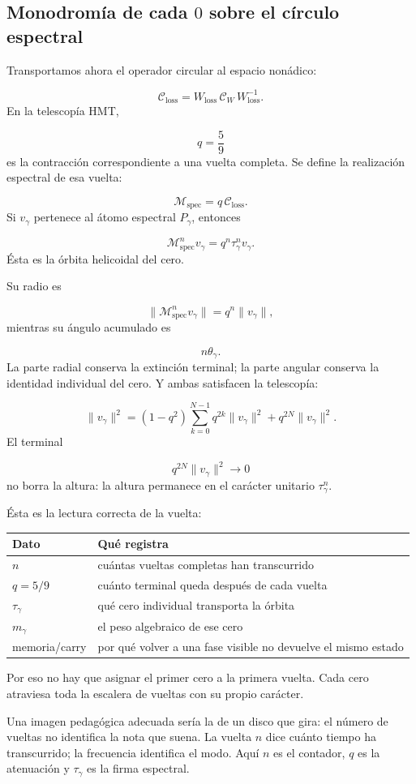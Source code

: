 \subsection{Monodromía de cada \(0\) sobre el círculo espectral}
Transportamos ahora el operador circular al espacio nonádico:\par
\[
\mathcal C_{\mathrm{loss}}
=
W_{\mathrm{loss}}\,
\mathcal C_W\,
W_{\mathrm{loss}}^{-1}.
\]
En la telescopía HMT,\par
\[
q=\frac59
\]
es la contracción correspondiente a una vuelta completa. Se define la realización espectral de esa vuelta:\par
\[
\mathcal M_{\mathrm{spec}}
=
q\,\mathcal C_{\mathrm{loss}}.
\]
Si \(v_\gamma\) pertenece al átomo espectral \(P_\gamma\), entonces\par
\[
\boxed{
\mathcal M_{\mathrm{spec}}^n v_\gamma
=
q^n\tau_\gamma^n v_\gamma.
}
\]
Ésta es la órbita helicoidal del cero.\par
Su radio es\par
\[
\|\mathcal M_{\mathrm{spec}}^n v_\gamma\|
=
q^n\|v_\gamma\|,
\]
mientras su ángulo acumulado es\par
\[
n\theta_\gamma.
\]
La parte radial conserva la extinción terminal; la parte angular conserva la identidad individual del cero. Y ambas satisfacen la telescopía:\par
\[
\|v_\gamma\|^2
=
(1-q^2)
\sum_{k=0}^{N-1}
q^{2k}\|v_\gamma\|^2
+
q^{2N}\|v_\gamma\|^2.
\]
El terminal\par
\[
q^{2N}\|v_\gamma\|^2
\longrightarrow0
\]
no borra la altura: la altura permanece en el carácter unitario \(\tau_\gamma^n\).\par
Ésta es la lectura correcta de la vuelta:\par
{}
\begin{center}
\small
\begin{tabularx}{\textwidth}{@{}YY@{}}
\toprule
Dato & Qué registra \\
\midrule
\(n\) & cuántas vueltas completas han transcurrido \\
\(q=5/9\) & cuánto terminal queda después de cada vuelta \\
\(\tau_\gamma\) & qué cero individual transporta la órbita \\
\(m_\gamma\) & el peso algebraico de ese cero \\
memoria/carry & por qué volver a una fase visible no devuelve el mismo estado \\
\bottomrule
\end{tabularx}
\end{center}
Por eso no hay que asignar el primer cero a la primera vuelta. Cada cero atraviesa toda la escalera de vueltas con su propio carácter.\par
Una imagen pedagógica adecuada sería la de un disco que gira: el número de vueltas no identifica la nota que suena. La vuelta \(n\) dice cuánto tiempo ha transcurrido; la frecuencia identifica el modo. Aquí \(n\) es el contador, \(q\) es la atenuación y \(\tau_\gamma\) es la firma espectral.\par
{}
